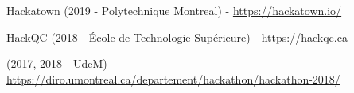 
\vspace{4mm}
\begin{cvitems}
    \item{Hackatown (2019 - Polytechnique Montreal) - {\url{https://hackatown.io/}}}
    \item{HackQC (2018 - École de Technologie Supérieure) - {\url{https://hackqc.ca}}}
    \item{ (2017, 2018 - UdeM) - {\url{https://diro.umontreal.ca/departement/hackathon/hackathon-2018/}}}
\end{cvitems}
\vspace{4mm}
